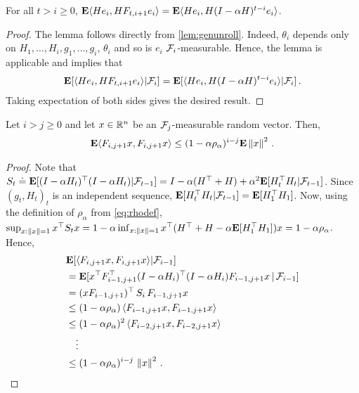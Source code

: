 \begin{lemma}\label{lem:unroll}
For all $t>i\ge 0$, $\mathbf{E} \langle He_i,H F_{t,i+1} e_i\rangle=\mathbf{E}\langle He_i,H(I-\alpha H)^{t-i} e_i\rangle$.
\end{lemma}
\begin{proof}
The lemma follows directly from \cref{lem:genunroll}. Indeed,
$\theta_i$ depends only on $H_1,\dots,H_{i},g_1,\dots,g_{i}$, $\theta_i$ and so is $e_i$ $\mathcal{F}_i$-measurable.
Hence, the lemma is applicable and implies that
\begin{align*}
\mathbf{E}[ \langle He_i, HF_{t,i+1} e_i\rangle | \mathcal{F}_i ] =
\mathbf{E}[ \langle He_i, H (I-\alpha H)^{t-i} e_i\rangle | \mathcal{F}_i ]\,.
\end{align*}
Taking expectation of both sides gives the desired result.
\end{proof}

\begin{lemma}\label{innerproduct}
Let $i>j \ge 0$ and let $x\in \mathbb{R}^n$ be an $\mathcal{F}_j$-measurable random vector.
Then,
\begin{align*}
\mathbf{E}\langle F_{i,j+1}x,F_{i,j+1}x\rangle\leq (1-\alpha \rho_\alpha)^{i-j}\mathbf{E}\left\| x\right\|^2\,.
\end{align*}
\end{lemma}
\begin{proof}
Note that
$S_t\doteq \mathbf{E}[ (I-\alpha H_t)^\top (I-\alpha H_t) | \mathcal{F}_{t-1} ]
= I - \alpha (H^\top + H) + \alpha^2 \mathbf{E}[ H_t^\top H_t | \mathcal{F}_{t-1} ]$.
Since $(g_t,H_t)_t$ is an independent sequence, $\mathbf{E}[ H_t^\top H_t|\mathcal{F}_{t-1}] = \mathbf{E}[ H_1^\top H_1 ]$.
Now, using the definition of $\rho_\alpha$ from \eqref{eq:rhodef},
$\sup_{x:\left\| x\right\|= 1} x^\top S_t x = 1 - \alpha \inf_{x:\left\| x\right\|=1} x^\top (H^\top + H - \alpha \mathbf{E}[H_1^\top H_1]) x
= 1-\alpha \rho_\alpha$.
Hence,
\begin{align*}
&\mathbf{E}[\langle F_{i,j+1}x,F_{i,j+1}x\rangle|\mathcal{F}_{i-1} ]\\
&= \mathbf{E}[x^\top F_{i-1,j+1}^\top (I-\alpha H_i)^\top (I-\alpha H_i) F_{i-1,j+1} x\,|\,\mathcal{F}_{i-1}]\\
&=(x F_{i-1,j+1})^\top \, S_i \, F_{i-1,j+1} x\\
&\le (1-\alpha \rho_\alpha) \, \langle F_{i-1,j+1} x, F_{i-1,j+1} x\rangle \\
& \le (1-\alpha \rho_\alpha)^2\, \langle F_{i-2,j+1} x, F_{i-2,j+1} x\rangle \\
& \quad \vdots \\
& \le (1-\alpha \rho_\alpha)^{i-j}\, \left\| x\right\|^2\,.
\end{align*}
\end{proof}
